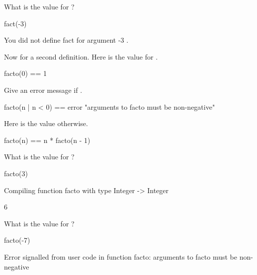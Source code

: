 \begin{xtc}
\begin{xtccomment}
What is the value for ?
\end{xtccomment}
\begin{spadsrc}
fact(-3) 
\end{spadsrc}
\begin{MessageOutput}
   You did not define fact for argument -3 .
\end{MessageOutput}
\end{xtc}
\begin{xtc}
\begin{xtccomment}
Now for a second definition.
Here is the value for .
\end{xtccomment}
\begin{spadsrc}
facto(0) == 1 
\end{spadsrc}
\end{xtc}
\begin{xtc}
\begin{xtccomment}
Give an error message if .
\end{xtccomment}
\begin{spadsrc}
facto(n | n < 0) == error "arguments to facto must be non-negative" 
\end{spadsrc}
\end{xtc}
\begin{xtc}
\begin{xtccomment}
Here is the value otherwise.
\end{xtccomment}
\begin{spadsrc}
facto(n) == n * facto(n - 1) 
\end{spadsrc}
\end{xtc}
\begin{xtc}
\begin{xtccomment}
What is the value for ?
\end{xtccomment}
\begin{spadsrc}
facto(3) 
\end{spadsrc}
\begin{MessageOutput}
   Compiling function facto with type Integer -> Integer 
\end{MessageOutput}
\begin{TeXOutput}
\begin{fricasmath}{7}
6%
\end{fricasmath}
\end{TeXOutput}
\end{xtc}
\begin{xtc}
\begin{xtccomment}
What is the value for ?
\end{xtccomment}
\begin{spadsrc}
facto(-7) 
\end{spadsrc}
\begin{MessageOutput}
   Error signalled from user code in function facto: 
      arguments to facto must be non-negative
\end{MessageOutput}
\end{xtc}

